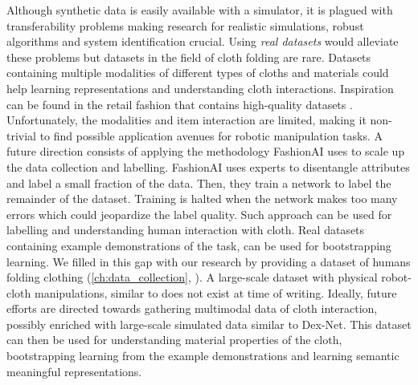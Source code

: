 \documentclass[\home/main.tex]{subfiles}
\begin{document}
Although synthetic data is easily available with a simulator, it is plagued with transferability problems making research for realistic simulations, robust algorithms and system identification crucial. Using \emph{real datasets} would alleviate these problems but datasets in the field of cloth folding are rare. Datasets containing multiple modalities of different types of cloths and materials could help learning representations and understanding cloth interactions. Inspiration can be found in the retail fashion that contains high-quality datasets \autocite{DeepFashion, DeepFashion2, FashionAI}. Unfortunately, the modalities and item interaction are limited, making it non-trivial to find possible application avenues for robotic manipulation tasks. A future direction consists of applying the methodology FashionAI \autocite{FashionAI} uses to scale up the data collection and labelling. FashionAI uses experts to disentangle attributes and label a small fraction of the data. Then, they train a network to label the remainder of the dataset. Training is halted when the network makes too many errors which could jeopardize the label quality. Such approach can be used for labelling and understanding human interaction with cloth. 
Real datasets containing example demonstrations of the task, can be used for bootstrapping learning. We filled in this gap with our research by providing a dataset of humans folding clothing (\cref{ch:data_collection}, \autocite{Verleysen2020-dataset}). A large-scale dataset with physical robot-cloth manipulations, similar to \autocite{Levine2016} does not exist at time of writing. Ideally, future efforts are directed towards gathering multimodal data of cloth interaction, possibly enriched with large-scale simulated data similar to Dex-Net. This dataset can then be used for understanding material properties of the cloth, bootstrapping learning from the example demonstrations and learning semantic meaningful representations.
\end{document}
